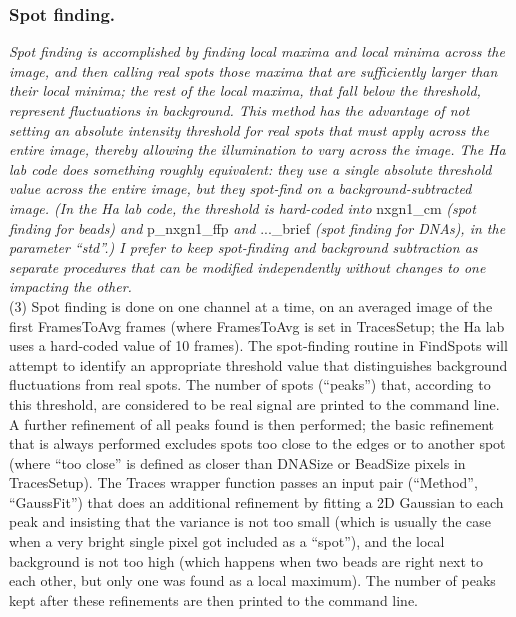 \documentclass[11pt]{article}
\begin{document}
\subsubsection{Spot finding.}\label{sec:SptFindBds}

{\it Spot finding is accomplished by finding local maxima and local minima across the image, and then calling real spots those maxima that are sufficiently larger than their local minima; the rest of the local maxima, that fall below the threshold, represent fluctuations in background.  This method has the advantage of not setting an absolute intensity threshold for real spots that must apply across the entire image, thereby allowing the illumination to vary across the image.  The Ha lab code does something roughly equivalent: they use a single absolute threshold value across the entire image, but they spot-find on a background-subtracted image. (In the Ha lab code, the threshold is hard-coded into} nxgn1\_cm {\it (spot finding for beads) and} p\_nxgn1\_ffp {\it and} ...\_brief {\it (spot finding for DNAs), in the parameter ``std''.) I prefer to keep spot-finding and background subtraction as separate procedures that can be modified independently without changes to one impacting the other.}\\

\noindent (3) Spot finding is done on one channel at a time, on an averaged image of the first FramesToAvg frames (where FramesToAvg is set in TracesSetup; the Ha lab uses a hard-coded value of 10 frames). The spot-finding routine in FindSpots will attempt to identify an appropriate threshold value that distinguishes background fluctuations from real spots. The number of spots (``peaks'') that, according to this threshold, are considered to be real signal are printed to the command line. A further refinement of all peaks found is then performed; the basic refinement that is always performed excludes spots too close to the edges or to another spot (where ``too close'' is defined as closer than DNASize or BeadSize pixels in TracesSetup). The Traces wrapper function passes an input pair (``Method'', ``GaussFit'') that does an additional refinement by fitting a 2D Gaussian to each peak and insisting that the variance is not too small (which is usually the case when a very bright single pixel got included as a ``spot''), and the local background is not too high (which happens when two beads are right next to each other, but only one was found as a local maximum). The number of peaks kept after these refinements are then printed to the command line.
\end{document}
